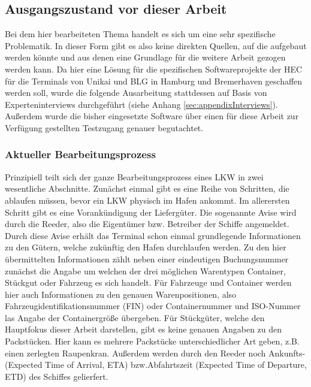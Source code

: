 \subsection{Ausgangszustand vor dieser Arbeit}

Bei dem hier bearbeiteten Thema handelt es sich um eine sehr spezifische Problematik. In dieser Form gibt es also keine direkten Quellen, auf die aufgebaut werden könnte und aus denen eine Grundlage für die weitere Arbeit gezogen werden kann. Da hier eine Lösung für die spezifischen Softwareprojekte der HEC für die Terminals von Unikai und BLG in Hamburg und Bremerhaven geschaffen werden soll, wurde die folgende Ausarbeitung stattdessen auf Basis von Experteninterviews durchgeführt (siehe Anhang \ref{sec:appendixInterviews}). Außerdem wurde die bisher eingesetzte Software über einen für diese Arbeit zur Verfügung gestellten Testzugang genauer begutachtet. 

\subsubsection{Aktueller Bearbeitungsprozess}

Prinzipiell teilt sich der ganze Bearbeitungsprozess eines LKW in zwei wesentliche Abschnitte. Zunächst einmal gibt es eine Reihe von Schritten, die ablaufen müssen, bevor ein LKW physisch im Hafen ankommt. Im allerersten Schritt gibt es eine Vorankündigung der Liefergüter. Die sogenannte Avise wird durch die Reeder, also die Eigentümer bzw. Betreiber der Schiffe angemeldet. Durch diese Avise erhält das Terminal schon einmal grundlegende Informationen zu den Gütern, welche zukünftig den Hafen durchlaufen werden. Zu den hier übermittelten Informationen zählt neben einer eindeutigen Buchungsnummer zunächst die Angabe um welchen der drei möglichen Warentypen Container, Stückgut oder Fahrzeug es sich handelt. Für Fahrzeuge und Container werden hier auch Informationen zu den genauen Warenpositionen, also Fahrzeugidentifikationsnummer (FIN) oder Containernummer und ISO-Nummer las Angabe der Containergröße übergeben. Für Stückgüter, welche den Hauptfokus dieser Arbeit darstellen, gibt es keine genauen Angaben zu den Packstücken. Hier kann es mehrere Packstücke unterschiedlicher Art geben, z.B. einen zerlegten Raupenkran. Außerdem werden durch den Reeder noch Ankunfts- (Expected Time of Arrival, ETA) bzw.Abfahrtszeit (Expected Time of Departure, ETD) des Schiffes gelierfert.

